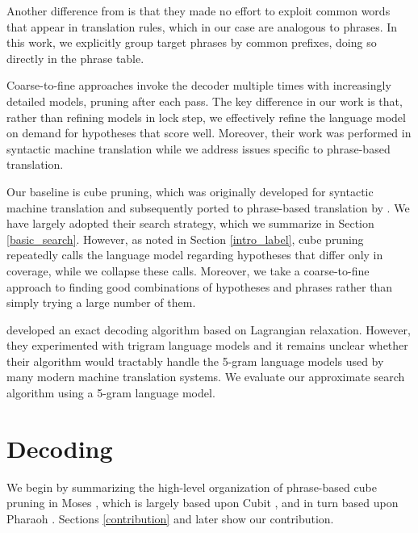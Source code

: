 \documentclass[11pt]{article}
\begin{document}
Another difference from  is that they made no effort to exploit common words that appear in translation rules, which in our case are analogous to phrases.  In this work, we explicitly group target phrases by common prefixes, doing so directly in the phrase table.  

Coarse-to-fine approaches \cite{coarsetofine,coarsetofineorig} invoke the decoder multiple times with increasingly detailed models, pruning after each pass.  The key difference in our work is that, rather than refining models in lock step, we effectively refine the language model on demand for hypotheses that score well.  Moreover, their work was performed in syntactic machine translation while we address issues specific to phrase-based translation.  

Our baseline is cube pruning, which was originally developed for syntactic machine translation \cite{cubepruning} and subsequently ported to phrase-based translation by .  We have largely adopted their search strategy, which we summarize in Section \ref{basic_search}.  However, as noted in Section \ref{intro_label}, cube pruning repeatedly calls the language model regarding hypotheses that differ only in coverage, while we collapse these calls.  Moreover, we take a coarse-to-fine approach to finding good combinations of hypotheses and phrases rather than simply trying a large number of them.  

 developed an exact decoding algorithm based on Lagrangian relaxation.  However, they experimented with trigram language models and it remains unclear whether their algorithm would tractably handle the 5-gram language models used by many modern machine translation systems.  We evaluate our approximate search algorithm using a 5-gram language model.  

\section{Decoding}
We begin by summarizing the high-level organization of phrase-based cube pruning in Moses \cite{moses}, which is largely based upon Cubit \cite{cubit}, and in turn based upon Pharaoh \cite{pharaoh}.  Sections \ref{contribution} and later show our contribution.  
\end{document}
